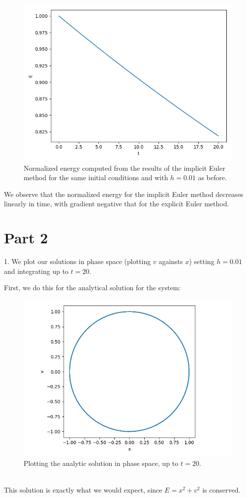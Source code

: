\documentclass[11pt]{article}
\begin{document}
\begin{figure}[htp]
\centering
\includegraphics[scale=0.70]{implicit_energy_1_0_0-01_20.png}
\caption{Normalized energy computed from the results of the implicit Euler method for the same initial conditions and with $h=0.01$ as before.}
\label{implicitenergy}
\end{figure}
We observe that the normalized energy for the implicit Euler method decreases linearly in time, with gradient negative that for the explicit Euler method.
\newpage

\section*{Part 2}
1. We plot our solutions in phase space (plotting $v$ againsts $x$) setting $h=0.01$ and integrating up to $t=20$.

First, we do this for the analytical solution for the system:
\begin{figure}[htp]
\centering
\includegraphics[scale=0.80]{analytic_phase_space_1_0_0-01_20.png}
\caption{Plotting the analytic solution in phase space, up to $t=20$.}
\label{analphase}
\end{figure}
\\
This solution is exactly what we would expect, since $E=x^2+v^2$ is conserved.
\newpage
\end{document}
